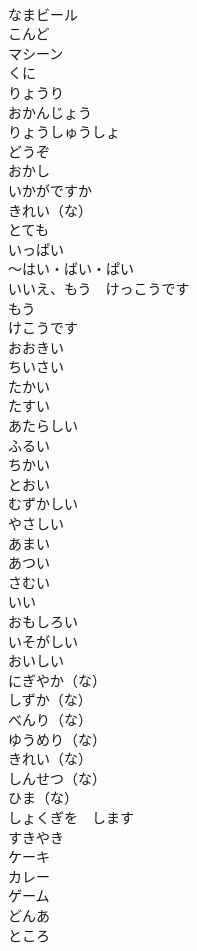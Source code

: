 \documentclass[8pt]{extreport}
\begin{document}
\begin{CJK}{UTF8}{min}
\\	なまビール		
\\	こんど		
\\	マシーン		
\\	くに		
\\	りょうり		
\\	おかんじょう		
\\	りょうしゅうしょ		
\\	どうぞ		
\\	おかし		
\\	いかがですか		
\\	きれい（な）		
\\	とても		
\\	いっぱい		
\\	〜はい・ばい・ぱい		
\\	いいえ、もう　けっこうです	
\\	もう	
\\	けこうです		
\\	おおきい		
\\	ちいさい		
\\	たかい		
\\	たすい		
\\	あたらしい		
\\	ふるい		
\\	ちかい		
\\	とおい		
\\	むずかしい		
\\	やさしい		
\\	あまい		
\\	あつい		
\\	さむい		
\\	いい		
\\	おもしろい		
\\	いそがしい		
\\	おいしい		
\\	にぎやか（な）		
\\	しずか（な）		
\\	べんり（な）		
\\	ゆうめり（な）		
\\	きれい（な）		
\\	しんせつ（な）		
\\	ひま（な）		
\\	しょくぎを　します		
\\	すきやき		
\\	ケーキ		
\\	カレー		
\\	ゲーム		
\\	どんあ		
\\	ところ		

\end{CJK}
\end{document}
